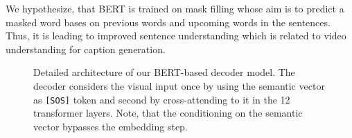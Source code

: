 \documentclass[runningheads,table]{llncs}
\newcommand{\modelName}{VASTA\xspace}
\newcommand{\sos}{\texttt{[SOS]}\xspace}
\begin{document}
\begin{table*}
    \caption{Comparison of BERT and GPTNeo~\cite{black2021gpt} as decoders for our model \modelName. BERT clearly outperforms GPTNeo as a decoder.}\label{tab:BERTGPT}
\end{table*}

We hypothesize, that BERT is trained on mask filling whose aim is to predict a masked word bases on previous words and upcoming words in the sentences.
Thus, it is leading to improved sentence understanding which is related to video understanding for caption generation.
\begin{figure}
    
    \caption{Detailed architecture of our BERT-based decoder model. The decoder considers the visual input once by using the semantic vector as \sos token and second by cross-attending to it in the 12 transformer layers. Note, that the conditioning on the semantic vector bypasses the embedding step.}\label{fig:decoder}
\end{figure}
\end{document}
